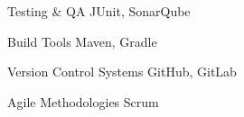\begin{cvskills}
  \cvskill
    {Testing \& QA} %
    {JUnit, SonarQube} %

  \cvskill
    {Build Tools} %
    {Maven, Gradle} %

  \cvskill
    {Version Control Systems} %
    {GitHub, GitLab} %

  \cvskill
    {Agile Methodologies} %
    {Scrum} %

\end{cvskills}